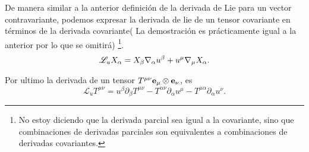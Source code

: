 \noindent De manera similar a la anterior definición de la derivada de Lie para un vector contravariante, podemos expresar la derivada de lie de un tensor covariante en términos de la derivada covariante( La demostración es prácticamente igual a la anterior por lo que se omitirá) \footnote{No estoy diciendo que la derivada parcial sea igual a la covariante, sino que combinaciones de derivadas parciales son equivalentes a combinaciones de derivadas covariantes.}.
\begin{equation}
    \mathscr{L}_u X_\alpha=X_\beta \mathbf{\nabla}_\alpha u^\beta+u^\mu \mathbf{\nabla}_\mu X_\alpha.
\end{equation}


\noindent Por ultimo la derivada de un tensor $T^{\mu \nu} \mathbf{e_\mu} \otimes \mathbf{e_\nu}$, es 
\begin{equation}
    \mathscr{L}_u T^{\mu \nu} = u^\beta \partial_\beta T^{\mu \nu}   -  T^{\alpha \nu} \partial_\alpha u^\mu  -T^{\mu \alpha} \partial_\alpha u^\nu.
\end{equation}

